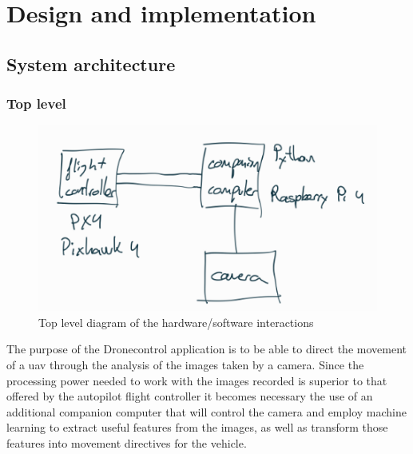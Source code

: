 \chapter{Design and implementation}
\label{chap:design}

\section{System architecture}
\label{sec:sysarch}

\subsection{Top level}

\begin{figure}
  \centering
  \includegraphics[keepaspectratio]{img/toplevel-sysarch.png}
  \caption{Top level diagram of the hardware/software interactions }\label{fig:toplevel}
\end{figure}

The purpose of the Dronecontrol application is to be able to direct the movement of a \gls{uav} through the analysis of the images taken by a camera.
Since the processing power needed to work with the images recorded is superior to that offered by the autopilot flight controller it becomes necessary the use of an additional companion computer that will control the camera and employ machine learning to extract useful features from the images, as well as transform those features into movement directives for the vehicle.

